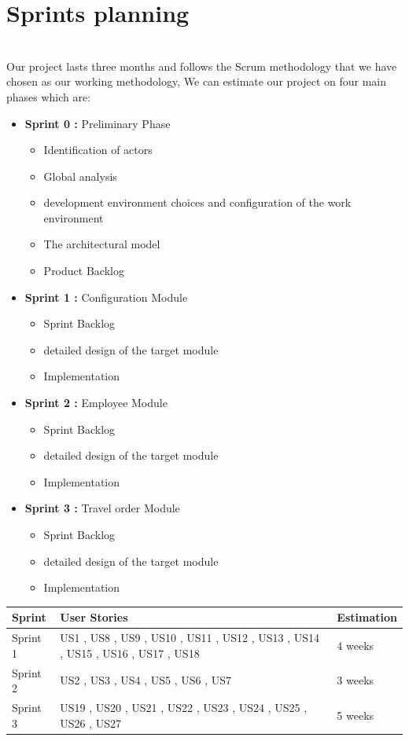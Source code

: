     \section{Sprints planning}
    \\Our project lasts three months and follows the Scrum methodology that we have chosen as our working methodology, We can estimate our project on four main phases which are:
    \begin{itemize}
        \item \textbf{Sprint 0 :} Preliminary Phase
        \begin{itemize}
\item Identification of actors
\item Global analysis
\item development environment choices and configuration of the work environment
\item The architectural model
\item Product Backlog
        \end{itemize}
        \item \textbf{Sprint 1 :} Configuration Module
        \begin{itemize}
\item Sprint Backlog 
\item detailed design of the target module
\item Implementation
        \end{itemize}
        \item \textbf{Sprint 2 :} Employee Module
        \begin{itemize}
\item Sprint Backlog 
\item detailed design of the target module
\item Implementation
        \end{itemize}
        \item \textbf{Sprint 3 :} Travel order Module
        \begin{itemize}
\item Sprint Backlog 
\item detailed design of the target module
\item Implementation
        \end{itemize}
    \end{itemize}
    
    \begin{table}[H]
    \begin{tabular}{|p{4cm}|p{}|p{4cm}|}
    \hline
\textbf{Sprint} 
&\textbf{User Stories}
&\textbf{Estimation}\\
\hline
Sprint 1
&US1 , US8 , US9 ,  US10 , US11 , US12 , US13 , US14 , US15 , US16 , US17 , US18
&4 weeks\\
\hline
Sprint 2
&US2 , US3 , US4 , US5 , US6 , US7
&3 weeks\\
\hline
Sprint 3
&US19 , US20 , US21 ,  US22 , US23 , US24 , US25 , US26 , US27 
&5 weeks\\
\hline
\end{tabular}
\end{table}


